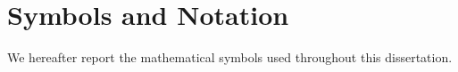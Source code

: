 			       



\chapter*{Symbols and Notation}

We hereafter report the mathematical symbols used throughout this dissertation.

